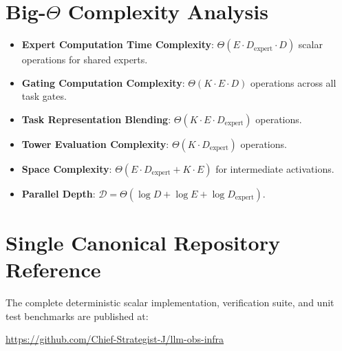 \documentclass[11pt,a4paper]{article}
\theoremstyle{definition}
\begin{document}
\section{Big-$\Theta$ Complexity Analysis}

\begin{itemize}
    \item \textbf{Expert Computation Time Complexity}: $\Theta(E \cdot D_{\text{expert}} \cdot D)$ scalar operations for shared experts.
    \item \textbf{Gating Computation Complexity}: $\Theta(K \cdot E \cdot D)$ operations across all task gates.
    \item \textbf{Task Representation Blending}: $\Theta(K \cdot E \cdot D_{\text{expert}})$ operations.
    \item \textbf{Tower Evaluation Complexity}: $\Theta(K \cdot D_{\text{expert}})$ operations.
    \item \textbf{Space Complexity}: $\Theta(E \cdot D_{\text{expert}} + K \cdot E)$ for intermediate activations.
    \item \textbf{Parallel Depth}: $\mathcal{D} = \Theta(\log D + \log E + \log D_{\text{expert}})$.
\end{itemize}

\section{Single Canonical Repository Reference}

The complete deterministic scalar implementation, verification suite, and unit test benchmarks are published at:
\begin{center}
\url{https://github.com/Chief-Strategist-J/llm-obs-infra}
\end{center}
\end{document}
